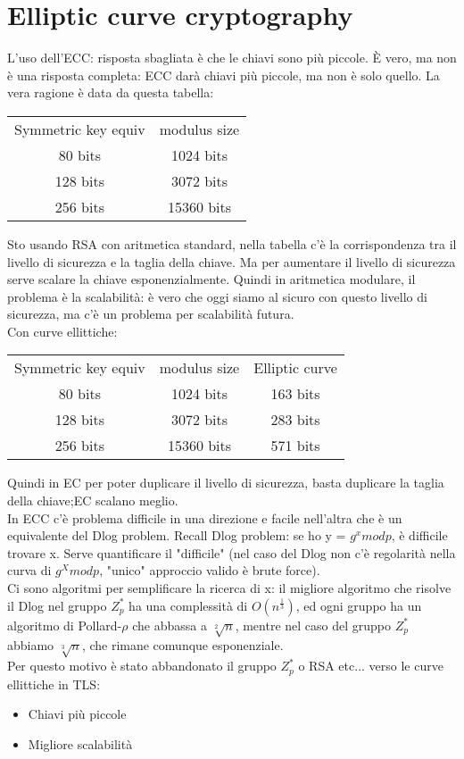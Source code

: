 \documentclass[16px]{article}
\begin{document}
\section{Elliptic curve cryptography}
L'uso dell'ECC: risposta sbagliata è che le chiavi sono più piccole. È vero, ma non è una risposta completa: ECC darà chiavi più piccole, ma non è solo quello. La vera ragione è data da questa tabella:
\begin{table}
\begin{tabular}{ c c }
Symmetric key equiv & modulus size\\
80 bits & 1024 bits\\
128 bits & 3072 bits\\
256 bits & 15360 bits\\
\end{tabular}
\end{table}
Sto usando RSA con aritmetica standard, nella tabella c'è la corrispondenza tra il livello di sicurezza e la taglia della chiave. Ma per aumentare il livello di sicurezza serve scalare la chiave esponenzialmente. Quindi in aritmetica modulare, il problema è la scalabilità: è vero che oggi siamo al sicuro con questo livello di sicurezza, ma c'è un problema per scalabilità futura.\\Con curve ellittiche:
\begin{table}
\begin{tabular}{ c c c }
Symmetric key equiv & modulus size & Elliptic curve\\
80 bits & 1024 bits & 163 bits\\
128 bits & 3072 bits & 283 bits\\
256 bits & 15360 bits & 571 bits\\
\end{tabular}
\end{table}
Quindi in EC per poter duplicare il livello di sicurezza, basta duplicare la taglia della chiave;EC scalano meglio.\\ In ECC c'è problema difficile in una direzione e facile nell'altra che è un equivalente del Dlog problem. Recall Dlog problem: se ho y = $g^xmodp$, è difficile trovare x. Serve quantificare il "difficile" (nel caso del Dlog non c'è regolarità nella curva di $g^Xmodp$, "unico" approccio valido è brute force).\\ Ci sono algoritmi per semplificare la ricerca di x: il migliore algoritmo che risolve il Dlog nel gruppo $Z_p^*$ ha una complessità di $O(n^{\frac{1}{3}})$, ed ogni gruppo ha un algoritmo di Pollard-$\rho$ che abbassa a $\sqrt[2]{n}$, mentre nel caso del gruppo $Z_p^*$ abbiamo $\sqrt[3]{n}$, che rimane comunque esponenziale.\\ Per questo motivo è stato abbandonato il gruppo $Z_p^*$ o RSA etc... verso le curve ellittiche in TLS:
\begin{itemize}
\item Chiavi più piccole
\item Migliore scalabilità
\end{itemize}
\end{document}

